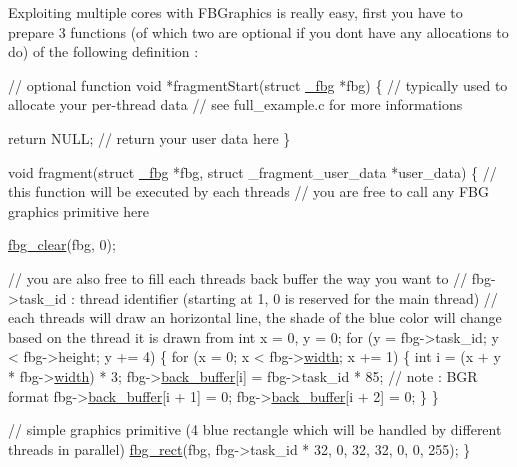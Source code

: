 Exploiting multiple cores with F\+B\+Graphics is really easy, first you have to prepare 3 functions (of which two are optional if you don\textquotesingle{}t have any allocations to do) of the following definition \+:


\begin{DoxyCode}
\textcolor{comment}{// optional function}
\textcolor{keywordtype}{void} *fragmentStart(\textcolor{keyword}{struct} \hyperlink{struct__fbg}{\_fbg} *fbg) \{
    \textcolor{comment}{// typically used to allocate your per-thread data}
    \textcolor{comment}{// see full\_example.c for more informations}

    \textcolor{keywordflow}{return} NULL; \textcolor{comment}{// return your user data here}
\}
\end{DoxyCode}



\begin{DoxyCode}
\textcolor{keywordtype}{void} fragment(\textcolor{keyword}{struct} \hyperlink{struct__fbg}{\_fbg} *fbg, \textcolor{keyword}{struct} \_fragment\_user\_data *user\_data) \{
    \textcolor{comment}{// this function will be executed by each threads}
    \textcolor{comment}{// you are free to call any FBG graphics primitive here}

    \hyperlink{fbgraphics_8h_aab50cccf3eceac81bda220a0c09e38e0}{fbg\_clear}(fbg, 0);

    \textcolor{comment}{// you are also free to fill each threads back buffer the way you want to}
    \textcolor{comment}{// fbg->task\_id : thread identifier (starting at 1, 0 is reserved for the main thread)}
    \textcolor{comment}{// each threads will draw an horizontal line, the shade of the blue color will change based on the
       thread it is drawn from}
    \textcolor{keywordtype}{int} x = 0, y = 0;
    \textcolor{keywordflow}{for} (y = fbg->task\_id; y < fbg->height; y += 4) \{
        \textcolor{keywordflow}{for} (x = 0; x < fbg->\hyperlink{struct__fbg_a1d3c76643e4ee424f4d17e27991d5e2e}{width}; x += 1) \{
            \textcolor{keywordtype}{int} i = (x + y * fbg->\hyperlink{struct__fbg_a1d3c76643e4ee424f4d17e27991d5e2e}{width}) * 3;
            fbg->\hyperlink{struct__fbg_a907e7fc97965b972c17114c885e53735}{back\_buffer}[i] = fbg->task\_id * 85; \textcolor{comment}{// note : BGR format}
            fbg->\hyperlink{struct__fbg_a907e7fc97965b972c17114c885e53735}{back\_buffer}[i + 1] = 0;
            fbg->\hyperlink{struct__fbg_a907e7fc97965b972c17114c885e53735}{back\_buffer}[i + 2] = 0;
        \}
    \}

    \textcolor{comment}{// simple graphics primitive (4 blue rectangle which will be handled by different threads in parallel)}
    \hyperlink{fbgraphics_8h_ad208d61ec4f50a5fd13f2cc8dd2ee0e5}{fbg\_rect}(fbg, fbg->task\_id * 32, 0, 32, 32, 0, 0, 255);
\}
\end{DoxyCode}



